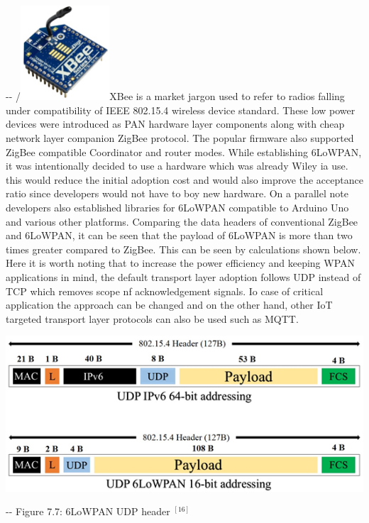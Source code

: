 \documentclass[12pt]{article}
\makeatletter
\newenvironment{indentation}[3]%
	{\par\setlength{\parindent}{#3}
	\setlength{\leftmargin}{#1}       \setlength{\rightmargin}{#2}%
	\advance\linewidth -\leftmargin       \advance\linewidth -\rightmargin%
	\advance\@totalleftmargin\leftmargin  \@setpar{{\@@par}}%
	\parshape 1\@totalleftmargin \linewidth\ignorespaces}{\par}%
\makeatother
\begin{document}
\begin{indentation}{0pt}{0pt}{0pt}
{\small /}\includegraphics[width=94pt]{img-34.png}\textbf{{\large  }}XBee is a
market jargon used to refer to radios falling under compatibility of IEEE
802.15.4 wireless device standard. These low power devices were introduced as PAN
hardware layer components along with cheap network layer companion ZigBee
protocol. The popular firmware also supported ZigBee compatible Coordinator and
router modes. While establishing 6LoWPAN, it was intentionally decided to use a
hardware which was already Wiley ia use. this would reduce the initial adoption
cost and would also improve the acceptance ratio since developers would not have
to boy new hardware. On a parallel note developers also established libraries for
6LoWPAN compatible to Arduino Uno and various other platforms. Comparing the data
headers of conventional ZigBee and 6LoWPAN, it can be seen that the payload of
6LoWPAN is more than two times greater compared to ZigBee. This can be seen by
calculations shown below. Here it is worth noting that to increase the power
efficiency and keeping WPAN applications in mind, the default transport layer
adoption follows UDP instead of TCP which removes scope nf acknowledgement
signals. Io case of critical application the approach can be changed and on the
other hand, other IoT targeted transport layer protocols can also be used such as
MQTT.
\end{indentation}

\includegraphics[width=415pt]{img-21.png}
\begin{center}
\begin{indentation}{0pt}{0pt}{0pt}
Figure 7.7: 6LoWPAN UDP header
$^{[16]}$

\end{indentation}
\end{center}
\end{document}
